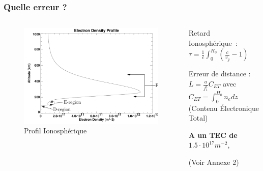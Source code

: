 \documentclass[xcolor=dvipsnames,envcountsect]{beamer}
\begin{document}
\begin{frame}
	\frametitle{Quelle erreur ?}
	\justifying
		\begin{columns}
			\begin{column}{0.5\textwidth}
				\begin{figure}
					\centering
					\includegraphics[width=1\textwidth]{./Figures/iono_profil.png}
					\caption {Profil Ionosphérique \cite{ionoprofil}}
				\end{figure}
			\end{column}
			\begin{column}{0.5\textwidth}

				Retard Ionosphérique : \\
				$\tau = \frac{1}{c} \int_{0}^{H_0} (\frac{c}{v_g}-1)$ \newline

				Erreur de distance : \\
				$L = \frac{a}{f_1^1} C_{ET}$ avec $C_{ET} = \int_{0}^{H_0} n_e dz$ (Contenu Électronique Total)
				\newline

				\begin{center}
					\textbf{A un TEC de }$1.5\cdot 10^{17} m^{-2}$, 
				\end{center}

				\begin{flushright}
					\tiny{(Voir Annexe 2)}
				\end{flushright}
			\end{column}
		\end{columns}
\end{frame}
\end{document}

